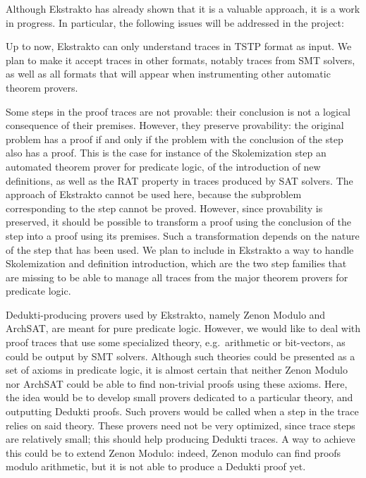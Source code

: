 \begin{description}
  Although Ekstrakto has already shown that it is a valuable approach, it is a
  work in progress. In particular, the following issues will be addressed in the
  project:

\begin{compactenum}
\item Up to now, Ekstrakto can only understand traces in TSTP format as
  input. We plan to make it accept traces in other formats, notably traces
  from SMT solvers, as well as all formats that will appear when instrumenting
  other automatic theorem provers.


\item Some steps in the proof traces are not provable: their
  conclusion is not a logical consequence of their premises. However,
  they preserve provability: the original problem has a proof if and
  only if the problem with the conclusion of the step also has a
  proof. This is the case for instance of the Skolemization step an
  automated theorem prover for predicate logic, of the introduction of
  new definitions, as well as the RAT property in traces produced by
  SAT solvers. The approach of Ekstrakto cannot be used here, because
  the subproblem corresponding to the step cannot be proved. However,
  since provability is preserved, it should be possible to transform a
  proof using the conclusion of the step into a proof using its
  premises. Such a transformation depends on the nature of the step
  that has been used. We plan to include in Ekstrakto a way to handle
  Skolemization and definition introduction, which are the two step
  families that are missing to be able to manage all traces from the
  major theorem provers for predicate logic.


\item  Dedukti-producing provers used by Ekstrakto, namely Zenon Modulo and
  ArchSAT, are meant for pure predicate logic. However, we would like
  to deal with proof traces that use some specialized theory,
  e.g.\ arithmetic or bit-vectors, as could be output by SMT
  solvers. Although such theories could be presented as a set of axioms
  in predicate logic, it is almost certain that neither Zenon Modulo
  nor ArchSAT could be able to find non-trivial proofs using these
  axioms. Here, the idea would be to develop small provers dedicated to
  a particular theory, and outputting Dedukti proofs. Such provers would
  be called when a step in the trace relies on said theory. These
  provers need not be very optimized, since trace steps are relatively
  small; this should help producing Dedukti traces. A way to achieve
  this could be to extend Zenon Modulo: indeed, Zenon modulo can find
  proofs modulo arithmetic, but it is not able to produce a Dedukti
  proof yet.

\end{compactenum}
  
\end{description}

